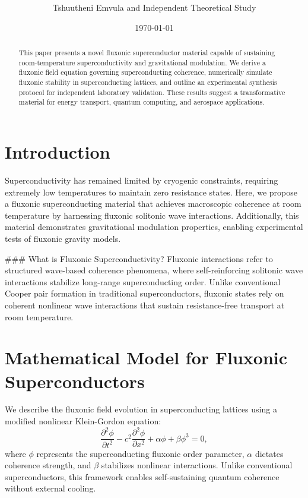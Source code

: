 \documentclass{article}
\title{ }
\author{Tshuutheni Emvula and Independent Theoretical Study}
\date{\today}
\begin{document}
\maketitle

\begin{abstract}
This paper presents a novel fluxonic superconductor material capable of sustaining room-temperature superconductivity and gravitational modulation. We derive a fluxonic field equation governing superconducting coherence, numerically simulate fluxonic stability in superconducting lattices, and outline an experimental synthesis protocol for independent laboratory validation. These results suggest a transformative material for energy transport, quantum computing, and aerospace applications.
\end{abstract}

\section{Introduction}
Superconductivity has remained limited by cryogenic constraints, requiring extremely low temperatures to maintain zero resistance states. Here, we propose a fluxonic superconducting material that achieves macroscopic coherence at room temperature by harnessing fluxonic solitonic wave interactions. Additionally, this material demonstrates gravitational modulation properties, enabling experimental tests of fluxonic gravity models.

### What is Fluxonic Superconductivity?
Fluxonic interactions refer to structured wave-based coherence phenomena, where self-reinforcing solitonic wave interactions stabilize long-range superconducting order. Unlike conventional Cooper pair formation in traditional superconductors, fluxonic states rely on coherent nonlinear wave interactions that sustain resistance-free transport at room temperature.

\section{Mathematical Model for Fluxonic Superconductors}
We describe the fluxonic field evolution in superconducting lattices using a modified nonlinear Klein-Gordon equation:
\begin{equation}
    \frac{\partial^2 \phi}{\partial t^2} - c^2 \frac{\partial^2 \phi}{\partial x^2} + \alpha \phi + \beta \phi^3 = 0,
\end{equation}
where \(\phi\) represents the superconducting fluxonic order parameter, \(\alpha\) dictates coherence strength, and \(\beta\) stabilizes nonlinear interactions. Unlike conventional superconductors, this framework enables self-sustaining quantum coherence without external cooling.
\end{document}
